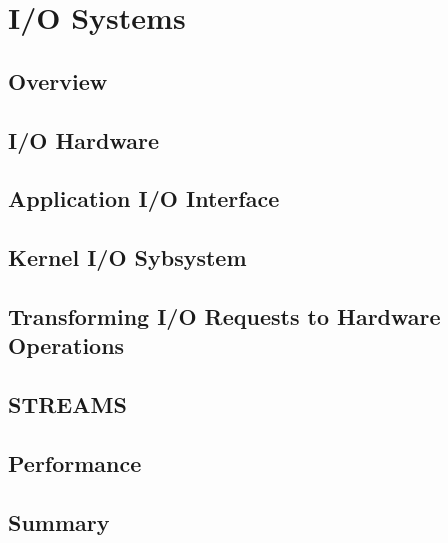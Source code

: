\section{I/O Systems}
\subsection{Overview}
\subsection{I/O Hardware}
\subsection{Application I/O Interface}
\subsection{Kernel I/O Sybsystem}
\subsection{Transforming I/O Requests to Hardware Operations}
\subsection{STREAMS}
\subsection{Performance}
\subsection{Summary}
